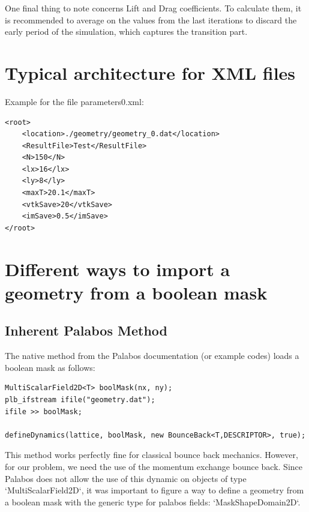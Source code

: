 \documentclass{article}
\begin{document}
One final thing to note concerns Lift and Drag coefficients. To calculate them, it is recommended to average on the values from the last iterations to discard the early period of the simulation, which captures the transition part. 

\newpage
\appendix


\section{Typical architecture for XML files} \label{app:xml}
Example for the file parameters\textunderscore0.xml:
\begin{verbatim}
<root>
    <location>./geometry/geometry_0.dat</location>
    <ResultFile>Test</ResultFile>
    <N>150</N>
    <lx>16</lx>
    <ly>8</ly>
    <maxT>20.1</maxT>
    <vtkSave>20</vtkSave>
    <imSave>0.5</imSave>
</root>
\end{verbatim}

\section{Different ways to import a geometry from a boolean mask} \label{app:bool}

\subsection{Inherent Palabos Method}
The native method from the Palabos documentation (or example codes) loads a boolean mask as follows: 
\begin{verbatim}
MultiScalarField2D<T> boolMask(nx, ny);
plb_ifstream ifile("geometry.dat");
ifile >> boolMask;

defineDynamics(lattice, boolMask, new BounceBack<T,DESCRIPTOR>, true);
\end{verbatim}
This method works perfectly fine for classical bounce back mechanics. However, for our problem, we need the use of the momentum exchange bounce back. Since Palabos does not allow the use of this dynamic on objects of type `MultiScalarField2D`, it was important to figure a way to define a geometry from a boolean mask with the generic type for palabos fields: `MaskShapeDomain2D`.
\end{document}
